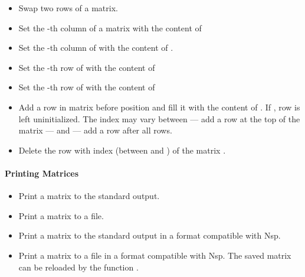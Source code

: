 \begin{itemize}
\item {}
  \sshortdescribe Swap two rows of a matrix.  

\item {}
    \sshortdescribe Set the -th column of a matrix  with the content of 
\item {}
    \sshortdescribe Set the -th column of  with the content of .

\item {}
    \sshortdescribe Set the -th row of  with the content of 
  \item {}
    \sshortdescribe Set the -th row of  with the content of 

\item {}
  \sshortdescribe Add a row in matrix  before position  and fill
  it with the content of . If , row  is left
  uninitialized. The index  may vary between  --- add a row at the
  top of the matrix --- and  --- add a row after all rows.

\item {}
  \sshortdescribe Delete the row with index  (between  and
  ) of the matrix .

\end{itemize}

\paragraph{Printing Matrices}

\begin{itemize}
\item {}
  \sshortdescribe Print a matrix to the standard output.  

\item {}
  \sshortdescribe Print a matrix to a file.

\item {}
  \sshortdescribe Print a matrix to the standard output in a format
  compatible with Nsp.  

\item {}
  \sshortdescribe Print a matrix to a file in a format compatible with Nsp. The
  saved matrix can be reloaded by the function
  .
\end{itemize}

